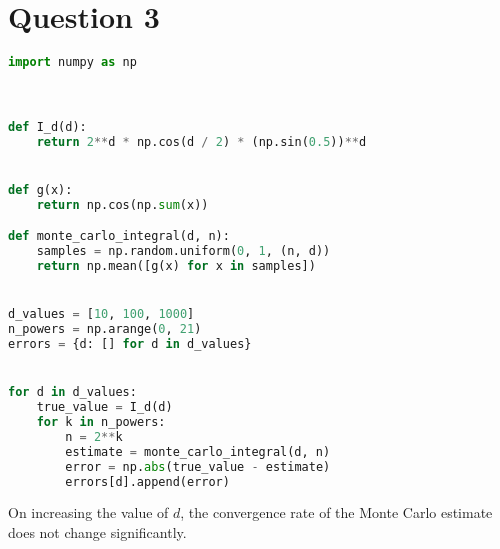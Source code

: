 \documentclass{article}
\date{November 2024}
\begin{document}
\maketitle

\section{Question 3}

\begin{lstlisting}[language=Python, caption=Monte Carlo Integration Python Code]
import numpy as np



def I_d(d):
    return 2**d * np.cos(d / 2) * (np.sin(0.5))**d


def g(x):
    return np.cos(np.sum(x))

def monte_carlo_integral(d, n):
    samples = np.random.uniform(0, 1, (n, d))
    return np.mean([g(x) for x in samples])


d_values = [10, 100, 1000]
n_powers = np.arange(0, 21)
errors = {d: [] for d in d_values}


for d in d_values:
    true_value = I_d(d)
    for k in n_powers:
        n = 2**k 
        estimate = monte_carlo_integral(d, n)
        error = np.abs(true_value - estimate)
        errors[d].append(error)

\end{lstlisting}

On increasing the value of \(d\), the convergence rate of the Monte Carlo estimate does not change significantly. 
\end{document}
